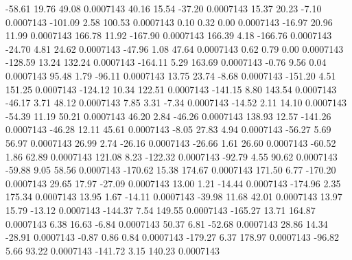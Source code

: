       -58.61       19.76       49.08     0.0007143
       40.16       15.54      -37.20     0.0007143
       15.37       20.23       -7.10     0.0007143
     -101.09        2.58      100.53     0.0007143
        0.10        0.32        0.00     0.0007143
      -16.97       20.96       11.99     0.0007143
      166.78       11.92     -167.90     0.0007143
      166.39        4.18     -166.76     0.0007143
      -24.70        4.81       24.62     0.0007143
      -47.96        1.08       47.64     0.0007143
        0.62        0.79        0.00     0.0007143
     -128.59       13.24      132.24     0.0007143
     -164.11        5.29      163.69     0.0007143
       -0.76        9.56        0.04     0.0007143
       95.48        1.79      -96.11     0.0007143
       13.75       23.74       -8.68     0.0007143
     -151.20        4.51      151.25     0.0007143
     -124.12       10.34      122.51     0.0007143
     -141.15        8.80      143.54     0.0007143
      -46.17        3.71       48.12     0.0007143
        7.85        3.31       -7.34     0.0007143
      -14.52        2.11       14.10     0.0007143
      -54.39       11.19       50.21     0.0007143
       46.20        2.84      -46.26     0.0007143
      138.93       12.57     -141.26     0.0007143
      -46.28       12.11       45.61     0.0007143
       -8.05       27.83        4.94     0.0007143
      -56.27        5.69       56.97     0.0007143
       26.99        2.74      -26.16     0.0007143
      -26.66        1.61       26.60     0.0007143
      -60.52        1.86       62.89     0.0007143
      121.08        8.23     -122.32     0.0007143
      -92.79        4.55       90.62     0.0007143
      -59.88        9.05       58.56     0.0007143
     -170.62       15.38      174.67     0.0007143
      171.50        6.77     -170.20     0.0007143
       29.65       17.97      -27.09     0.0007143
       13.00        1.21      -14.44     0.0007143
     -174.96        2.35      175.34     0.0007143
       13.95        1.67      -14.11     0.0007143
      -39.98       11.68       42.01     0.0007143
       13.97       15.79      -13.12     0.0007143
     -144.37        7.54      149.55     0.0007143
     -165.27       13.71      164.87     0.0007143
        6.38       16.63       -6.84     0.0007143
       50.37        6.81      -52.68     0.0007143
       28.86       14.34      -28.91     0.0007143
       -0.87        0.86        0.84     0.0007143
     -179.27        6.37      178.97     0.0007143
      -96.82        5.66       93.22     0.0007143
     -141.72        3.15      140.23     0.0007143
